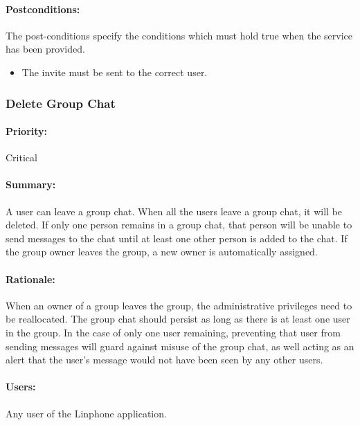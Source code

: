 \documentclass[11pt]{article}
\begin{document}
\paragraph{Postconditions:}
The post-conditions specify the conditions which must hold true when the service has been provided.
 \begin{itemize}
\item	The invite must be sent to the correct user.
\end{itemize}

\subsubsection{Delete Group Chat} \label{UC-delete-group}
\paragraph{Priority:}Critical
\paragraph{Summary:}A user can leave a group chat. When all the users leave a group chat, it will be deleted. If only one person remains in a group chat, that person will be unable to send messages to the chat until at least one other person is added to the chat. If the group owner leaves the group, a new owner is automatically assigned.
\paragraph{Rationale:}When an owner of a group leaves the group, the administrative privileges need to be reallocated. The group chat should persist as long as there is at least one user in the group. In the case of only one user remaining, preventing that user from sending messages will guard against misuse of the group chat, as well acting as an alert that the user's message would not have been seen by any other users.
\paragraph{Users:} Any user of the Linphone application.
\end{document}

